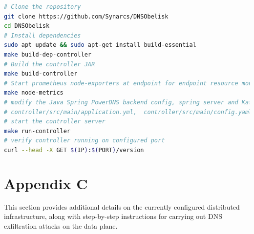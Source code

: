 \documentclass [11pt, proquest] {uwthesis}[2020/02/24]
\begin{document}
{\footnotesize
\begin{lstlisting}[language=bash, 
    caption={Installation steps for compiling and running controller server in control plane}, 
    label={lst:install-steps-control-plane},
    aboveskip=0.5em, 
    belowskip=0.5em
]
# Clone the repository
git clone https://github.com/Synarcs/DNSObelisk
cd DNSObelisk
# Install dependencies
sudo apt update && sudo apt-get install build-essential 
make build-dep-controller 
# Build the controller JAR
make build-controller 
# Start prometheus node-exporters at endpoint for endpoint resource monitoring 
make node-metrics
# modify the Java Spring PowerDNS backend config, spring server and Kafka broker connection config to point to correct endpoints
# controller/src/main/application.yml,  controller/src/main/config.yaml
# start the controller server
make run-controller
# verify controller running on configured port
curl --head -X GET $(IP):$(PORT)/version 
\end{lstlisting}
}




\section{Appendix C}
This section provides additional details on the currently configured distributed infrastructure, along with step-by-step instructions for carrying out DNS exfiltration attacks on the data plane.
\end{document}
